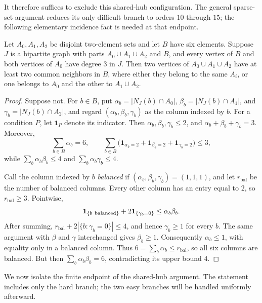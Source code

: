 It therefore suffices to exclude this shared-hub configuration.  The
general sparse-set argument reduces its only difficult branch to orders
\(10\) through \(15\); the following elementary incidence fact is needed
at that endpoint.

\begin{lemma}\label{lem:six-column}
Let \(A_0,A_1,A_2\) be disjoint two-element sets and let \(B\) have six
elements.  Suppose \(J\) is a bipartite graph with parts
\(A_0\cup A_1\cup A_2\) and \(B\), and every vertex of \(B\) and both
vertices of \(A_0\) have degree \(3\) in \(J\).  Then two vertices of
\(A_0\cup A_1\cup A_2\) have at least two common neighbors in \(B\),
where either they belong to the same \(A_i\), or one belongs to \(A_0\)
and the other to \(A_1\cup A_2\).
\end{lemma}

\begin{proof}
Suppose not.  For \(b\in B\), put
\(\alpha_b=|N_J(b)\cap A_0|\), \(\beta_b=|N_J(b)\cap A_1|\), and
\(\gamma_b=|N_J(b)\cap A_2|\), and regard
\((\alpha_b,\beta_b,\gamma_b)\) as the column indexed by \(b\).  For a
condition \(P\), let \(\mathbf1_P\) denote its indicator.  Then
\(\alpha_b,\beta_b,\gamma_b\le2\), and
\(\alpha_b+\beta_b+\gamma_b=3\).  Moreover,
\[
 \sum_{b\in B}\alpha_b=6,\qquad
 \sum_{b\in B}\!\bigl(\mathbf1_{\alpha_b=2}
   +\mathbf1_{\beta_b=2}+\mathbf1_{\gamma_b=2}\bigr)\le3,
\]
while
\(\sum_b\alpha_b\beta_b\le4\) and
\(\sum_b\alpha_b\gamma_b\le4\).

Call the column indexed by \(b\) \emph{balanced} if
\((\alpha_b,\beta_b,\gamma_b)=(1,1,1)\), and let \(r_{\mathrm{bal}}\) be the
number of balanced columns.  Every other column has an entry equal to \(2\),
so \(r_{\mathrm{bal}}\ge3\).  Pointwise,
\[
 \mathbf1_{\{b\ {\rm balanced}\}}+2\mathbf1_{\{\gamma_b=0\}}
 \le\alpha_b\beta_b.
\]
After summing, \(r_{\mathrm{bal}}+2|\{b:\gamma_b=0\}|\le4\), and hence
\(\gamma_b\ge1\) for every \(b\).  The same argument with
\(\beta\) and \(\gamma\) interchanged gives \(\beta_b\ge1\).
Consequently \(\alpha_b\le1\), with equality only in a balanced
column.  Thus \(6=\sum_b\alpha_b\le r_{\mathrm{bal}}\), so all six columns are
balanced.  But then \(\sum_b\alpha_b\beta_b=6\), contradicting its
upper bound \(4\).
\end{proof}

We now isolate the finite endpoint of the shared-hub argument.  The
statement includes only the hard branch; the two easy branches will be
handled uniformly afterward.

